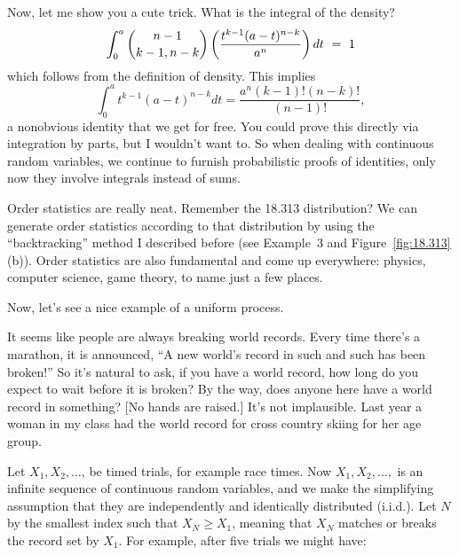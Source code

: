 \medskip

Now, let me show you a cute trick. 
What is the integral of the density?
\[
  \int_0^a {n-1\choose k-1,n-k}
	\left(\frac{t^{k-1}(a-t)^{n-k}}{a^n}\right) dt\ =\ 1
\]
which follows from the definition of density. 
This implies
\[
  \int_0^a  t^{k-1}(a-t)^{n-k} dt 
  = 
  \frac{a^n(k-1)!(n-k)!}{(n-1)!},
\]
a nonobvious identity that we get for free.  
You could prove this directly via integration by parts, but I
wouldn't want to.
So when dealing with continuous random variables, we continue to furnish
probabilistic proofs of identities, only now they involve integrals 
instead of sums.  
\QED

\medskip

Order statistics are really neat. 
Remember the 18.313 distribution?  We can generate order statistics
according to that distribution by using the ``backtracking'' method I
described before (see Example~3 and Figure~\ref{fig:18.313}(b)). 
Order statistics are also fundamental and come up everywhere:  physics,
computer science, game theory, to name just a few places. 

Now, let's see a nice example of a uniform process.

\medskip


\medskip

It seems like people are always breaking world records.
Every time there's a marathon, it is announced, ``A new world's record in
such and such has been broken!''
So it's natural to ask, if you have a world record, how long do you
expect to wait before it is broken?
By the way, does anyone here have a world record in something?
[No hands are raised.] 
It's not implausible. 
Last year a woman in my class had the world record for cross country
skiing for her age group.  

Let $X_1, X_2, \ldots$, be timed trials, for example race times.
Now $X_1,X_2,\ldots,$ is an infinite
sequence of continuous random variables, and 
we make the simplifying assumption that they are independently and
identically distributed (i.i.d.). 
Let $N$ by the smallest index such that $X_N \geq X_1$, meaning that
$X_N$ matches or breaks the record set by $X_1$.
For example, after five trials we might have:
\begin{center}
\mbox{}
\end{center}

\medskip

